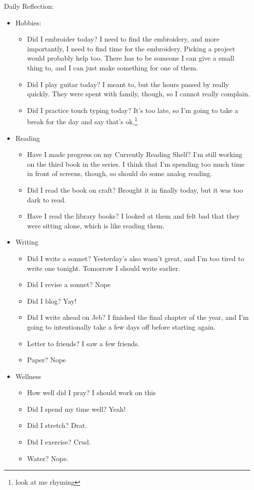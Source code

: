 \documentclass[12pt]{article}[titlepage]
\newcommand{\1}{\={a}}
\newcommand{\2}{\={e}}
\newcommand{\3}{\={\i}}
\newcommand{\4}{\=o}
\newcommand{\5}{\=u}
\newcommand{\6}{\={A}}
\renewcommand{\,}{\textsuperscript{,}}
\begin{document}
Daily Reflection:
\begin{itemize}
\item Hobbies:
\begin{itemize}
\item Did I embroider today? I need to find the embroidery, and more importantly, I need to find time for the embroidery. Picking a project would probably help too. There has to be someone I can give a small thing to, and I can just make something for one of them.
\item Did I play guitar today? I meant to, but the hours passed by really quickly. They were spent with family, though, so I cannot really complain.
\item Did I practice touch typing today? It's too late, so I'm going to take a break for the day and say that's ok.\footnote{look at me rhyming}
\end{itemize}
\item Reading
\begin{itemize}
\item Have I made progress on my Currently Reading Shelf? I'm still working on the third book in the series. I think that I'm spending too much time in front of screens, though, so should do some analog reading.
\item Did I read the book on craft? Brought it in finally today, but it was too dark to read.
\item Have I read the library books? I looked at them and felt bad that they were sitting alone, which is like reading them.
\end{itemize}
\item Writing
\begin{itemize}
\item Did I write a sonnet? Yesterday's also wasn't great, and I'm too tired to write one tonight. Tomorrow I should write earlier.
\item Did I revise a sonnet? Nope
\item Did I blog? Yay!
\item Did I write ahead on Jeb? I finished the final chapter of the year, and I'm going to intentionally take a few days off before starting again.
\item Letter to friends? I saw a few friends.
\item Paper? Nope
\end{itemize}
\item Wellness
\begin{itemize}
\item How well did I pray? I should work on this
\item Did I spend my time well? Yeah!
\item Did I stretch? Drat.
\item Did I exercise? Crud.
\item Water? Nope.
\end{itemize}
\end{itemize}
\end{document}
